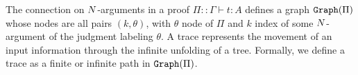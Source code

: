%
%
%
%
%




The connection on ${N}$-arguments in a proof $\Pi::\Gamma\vdash t:A$ defines a 
graph ${\tt Graph}(\Pi)$ whose nodes are all pairs $(k,\theta)$, with $\theta$ node of $\Pi$ and 
$k$ index of some ${N}$-argument of  the judgment labeling $\theta$. 
A trace represents the movement of an input information through the 
infinite unfolding of a tree. Formally, we define a trace as a finite or infinite path 
in ${\tt Graph}(\Pi)$.


